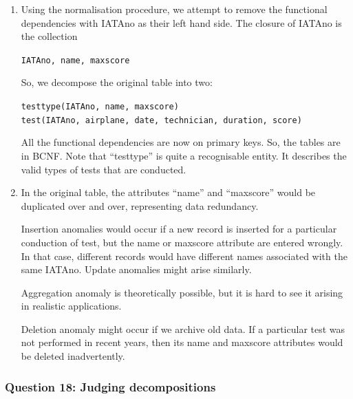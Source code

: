 \begin{enumerate}[label=\alph*.]
  \item Using the normalisation procedure, we attempt to remove the functional dependencies with IATAno as their left
  hand side. The closure of IATAno is the collection

  \texttt{IATAno, name, maxscore}

  So, we decompose the original table into two:

  \texttt{testtype(IATAno, name, maxscore)}\\
  \texttt{test(IATAno, airplane, date, technician, duration, score)}

  All the functional dependencies are now on primary keys. So, the tables are in BCNF. Note that “testtype”
  is quite a recognisable entity. It describes the valid types of tests that are conducted.

  \item In the original table, the attributes “name” and “maxscore” would be duplicated over and over, representing
  data redundancy.

  Insertion anomalies would occur if a new record is inserted for a particular conduction of test, but the name or
  maxscore attribute are entered wrongly. In that case, different records would have different names associated
  with the same IATAno. Update anomalies might arise similarly.

  Aggregation anomaly is theoretically possible, but it is hard to see it arising in realistic applications.

  Deletion anomaly might occur if we archive old data. If a particular test was not performed in recent years,
  then its name and maxscore attributes would be deleted inadvertently.
\end{enumerate}
\subsubsection{Question 18: Judging decompositions}

